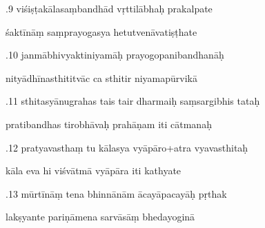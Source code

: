 \documentclass[article,12pt,a4paper]{memoir}%
\newcounter{parCount}
\begin{document}
	  
	  \pstart {}.9 viśiṣṭakālasaṃbandhād vṛttilābhaḥ prakalpate 
	{}
	\pend%
      

	  
	  \pstart \leavevmode%
	śaktīnāṃ saṃprayogasya hetutvenāvatiṣṭhate 
	{}
	\pend%
      

	  
	  \pstart {}.10 janmābhivyaktiniyamāḥ prayogopanibandhanāḥ 
	{}
	\pend%
      

	  
	  \pstart \leavevmode%
	nityādhīnasthititvāc ca sthitir niyamapūrvikā 
	{}
	\pend%
      

	  
	  \pstart {}.11 sthitasyānugrahas tais tair dharmaiḥ saṃsargibhis tataḥ 
	{}
	\pend%
      

	  
	  \pstart \leavevmode%
	pratibandhas tirobhāvaḥ prahāṇam iti cātmanaḥ 
	{}
	\pend%
      

	  
	  \pstart {}.12 pratyavasthaṃ tu kālasya vyāpāro+atra vyavasthitaḥ 
	{}
	\pend%
      

	  
	  \pstart \leavevmode%
	kāla eva hi viśvātmā vyāpāra iti kathyate 
	{}
	\pend%
      

	  
	  \pstart {}.13 mūrtīnāṃ tena bhinnānām ācayāpacayāḥ pṛthak 
	{}
	\pend%
      

	  
	  \pstart \leavevmode%
	lakṣyante pariṇāmena sarvāsāṃ bhedayoginā 
	{}
	\pend%
      
\end{document}
